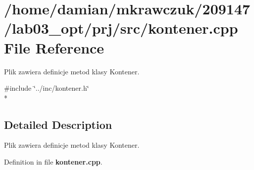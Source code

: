 \section{/home/damian/mkrawczuk/209147/lab03\-\_\-opt/prj/src/kontener.cpp File Reference}
\label{kontener_8cpp}


Plik zawiera definicje metod klasy Kontener.  


{\ttfamily \#include \char`\"{}../inc/kontener.\-h\char`\"{}}\\*


\subsection{Detailed Description}
Plik zawiera definicje metod klasy Kontener. 

Definition in file {\bf kontener.\-cpp}.

